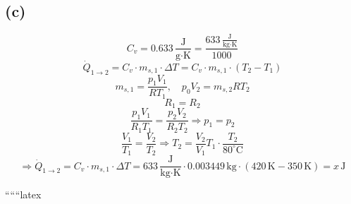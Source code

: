 

\subsection*{(c)}

\[
C_v = 0.633 \, \frac{\text{J}}{\text{g} \cdot \text{K}} = \frac{633 \, \frac{\text{J}}{\text{kg} \cdot \text{K}}}{1000}
\]
\[
\dot{Q}_{1 \rightarrow 2} = C_v \cdot m_{s,1} \cdot \Delta T = C_v \cdot m_{s,1} \cdot (T_2 - T_1)
\]
\[
m_{s,1} = \frac{p_1 V_1}{R T_1}, \quad p_0 V_2 = m_{s,2} R T_2
\]
\[
R_1 = R_2
\]
\[
\frac{p_1 V_1}{R_1 T_1} = \frac{p_2 V_2}{R_2 T_2} \Rightarrow p_1 = p_2
\]
\[
\frac{V_1}{T_1} = \frac{V_2}{T_2} \Rightarrow T_2 = \frac{V_2}{V_1} T_1 \cdot \frac{T_2}{80^\circ \text{C}}
\]
\[
\Rightarrow \dot{Q}_{1 \rightarrow 2} = C_v \cdot m_{s,1} \cdot \Delta T = 633 \, \frac{\text{J}}{\text{kg} \cdot \text{K}} \cdot 0.003449 \, \text{kg} \cdot (420 \, \text{K} - 350 \, \text{K}) = x \, \text{J}
\]

``````latex